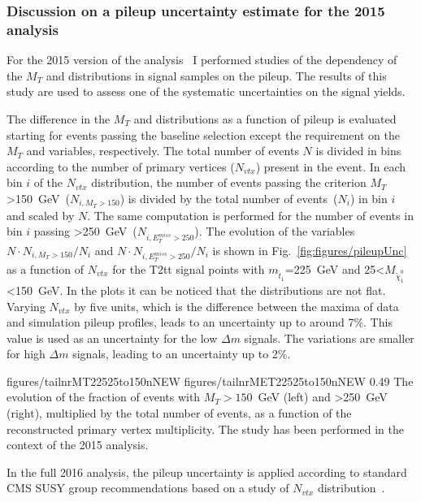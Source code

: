 \subsubsection{Discussion on a pileup uncertainty estimate for the 2015 analysis}

For the 2015 version of the analysis~\cite{Sirunyan:2016jpr} I performed studies of the dependency of the $M_{T}$ and \MET distributions in signal samples on the pileup. The results of this study are used to assess one of the systematic uncertainties on the signal yields. 


The difference in the $M_{T}$ and \MET distributions as a function of pileup is evaluated starting for events passing the baseline selection except the requirement on the $M_{T}$ and \MET variables, respectively. The total number of events $N$ is divided in bins according to  the number of primary vertices  ($N_{vtx}$) present in the event. In each  bin $i$ of the $N_{vtx}$ distribution, the number of events passing the criterion $M_{T}$>150~GeV~($N_{i,M_{T}>150}$) is divided by the total number of events~($N_{i}$) in bin $i$ and scaled by $N$. The same computation is performed for the number of events in bin $i$ passing \MET>250~GeV~($N_{i,E_{T}^{miss}>250}$). The evolution of the variables $N \cdot N_{i,M_{T}>150}/N_{i}$ and $N \cdot N_{i,E_{T}^{miss}>250}/N_{i}$ is shown in  Fig.~\ref{fig:figures/pileupUnc} as a function of $N_{vtx}$ for the T2tt signal points with $m_{\tilde{t}_{1}}$=225~GeV and 25<$M_{\tilde{\chi}_{1}^{0}}$<150~GeV. In the plots it can be noticed that  the distributions are not flat. Varying $N_{vtx}$ by five units, which is the difference between the maxima of data and simulation pileup profiles, leads to an uncertainty up to around 7\%. This value is used as an uncertainty for the low $\Delta m$ signals. The variations are smaller for high $\Delta m$ signals, leading to an uncertainty up to 2\%.

                 {figures/tailnrMT22525to150nNEW} %
                 {figures/tailnrMET22525to150nNEW} %
                 {0.49}       %
                 { The evolution  of the fraction of events with $M_{T}>150$~GeV (left) and \MET>250~GeV (right), multiplied by the total number of events, as a function of the reconstructed primary vertex multiplicity. The study has been performed in the context of the 2015 analysis. }


 In the full 2016 analysis, the pileup uncertainty is applied according to standard CMS SUSY group recommendations based on a study of $N_{vtx}$ distribution~\cite{website:SUSYrec}.

